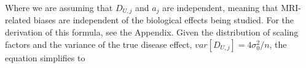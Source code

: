Where we are assuming that $D_{U,j}$ and $a_j$ are independent, meaning that MRI-related biases are independent of the biological effects being studied. For the derivation of this formula, see the Appendix. Given the distribution of scaling factors and the variance of the true disease effect, $var[D_{U,j}] = 4\sigma_0^2/n$, the equation simplifies to